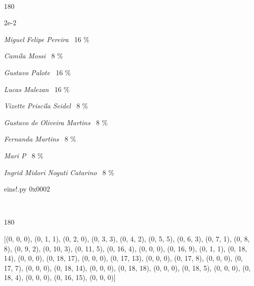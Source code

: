 \documentclass[12pt]{article}
\begin{document}
	\ 
	\vfill
	\begin{turn}{180}	
		\begin{minipage}{\textwidth}
			\centering
			{\Huge 2e-2}
		  
			\hfill
		  
			

\textit{Miguel Felipe Pereira}
	\ 16 \%

\textit{Camila Mossi}
	\ 8 \%

\textit{Gustavo Palote}
	\ 16 \%

\textit{Lucas Malezan}
	\ 16 \%

\textit{Vizette Priscila Seidel}
	\ 8 \%

\textit{Gustavo de Oliveira Martins}
	\ 8 \%

\textit{Fernanda Martins}
	\ 8 \%

\textit{Mari P}
	\ 8 \%

\textit{Ingrid Midori Noguti Catarino}
	\ 8 \%

\bigskip

eins!.py
0x0002


		\end{minipage}	
	\end{turn}
	\vfill
	\

\pagebreak

	\begin{turn}{180}	
		\begin{minipage}{\textwidth}[(0, 0, 0), (0, 1, 1), (0, 2, 0), (0, 3, 3), (0, 4, 2), (0, 5, 5), (0, 6, 3), (0, 7, 1), (0, 8, 8), (0, 9, 2), (0, 10, 3), (0, 11, 5), (0, 16, 4), (0, 0, 0), (0, 16, 9), (0, 1, 1), (0, 18, 14), (0, 0, 0), (0, 18, 17), (0, 0, 0), (0, 17, 13), (0, 0, 0), (0, 17, 8), (0, 0, 0), (0, 17, 7), (0, 0, 0), (0, 18, 14), (0, 0, 0), (0, 18, 18), (0, 0, 0), (0, 18, 5), (0, 0, 0), (0, 18, 4), (0, 0, 0), (0, 16, 15), (0, 0, 0)]	  
				
		\end{minipage}	
	\end{turn} 

\pagebreak
\sffamily
\large
\end{document}
